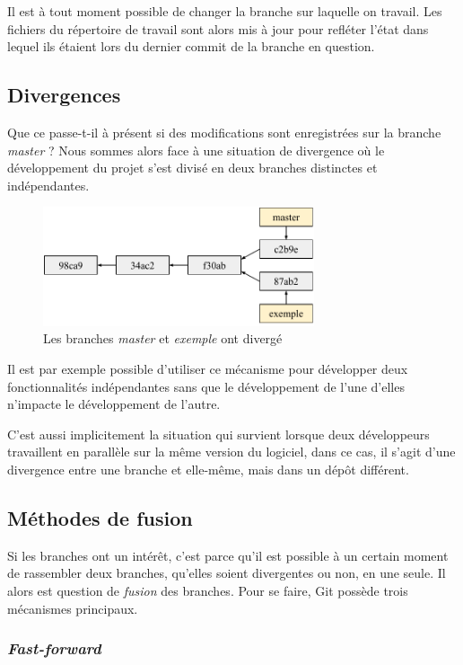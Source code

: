 \documentclass[11pt,a4paper]{article}
\begin{document}
Il est à tout moment possible de changer la branche sur laquelle on travail. Les fichiers du répertoire de travail sont alors mis à jour pour refléter l'état dans lequel ils étaient lors du dernier commit de la branche en question.

\subsection{Divergences}

Que ce passe-t-il à présent si des modifications sont enregistrées sur la branche \textit{master} ? Nous sommes alors face à une situation de divergence où le développement du projet s'est divisé en deux branches distinctes et indépendantes.

\begin{figure}[h]
\begin{center}
\includegraphics[width=8cm]{img_divergence}
\caption{Les branches \textit{master} et \textit{exemple} ont divergé}
\end{center}
\end{figure}

Il est par exemple possible d'utiliser ce mécanisme pour développer deux fonctionnalités indépendantes sans que le développement de l'une d'elles n'impacte le développement de l'autre.

C'est aussi implicitement la situation qui survient lorsque deux développeurs travaillent en parallèle sur la même version du logiciel, dans ce cas, il s'agit d'une divergence entre une branche et elle-même, mais dans un dépôt différent.

\subsection{Méthodes de fusion}

Si les branches ont un intérêt, c'est parce qu'il est possible à un certain moment de rassembler deux branches, qu'elles soient divergentes ou non, en une seule. Il alors est question de \textit{fusion} des branches. Pour se faire, Git possède trois mécanismes principaux.

\subsubsection{\textit{Fast-forward}}
\end{document}
